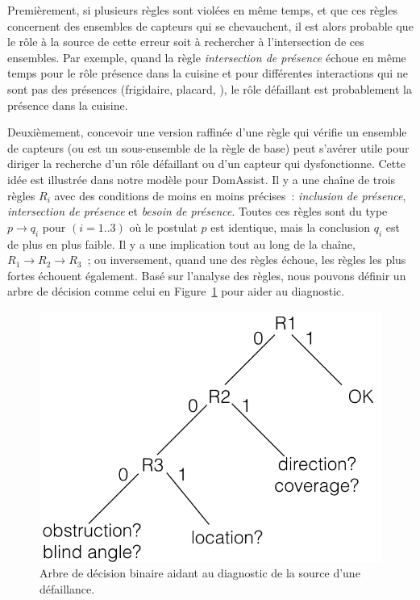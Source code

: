 Premièrement, si plusieurs règles sont violées en même temps, et que ces règles 
concernent des ensembles de capteurs qui se chevauchent, il est alors probable 
que le rôle à la source de cette erreur soit à rechercher à l'intersection de 
ces ensembles. Par exemple, quand la règle {\em intersection de présence} 
échoue en même temps pour le rôle présence dans la cuisine et pour différentes 
interactions qui ne sont pas des présences (frigidaire, placard, \etc), 
le rôle défaillant est 
probablement 
la présence 
dans la cuisine. 

Deuxièmement, concevoir une version raffinée d'une règle qui vérifie un ensemble 
de capteurs (ou est un sous-ensemble de la règle de base) peut s'avérer utile 
pour diriger la recherche d'un rôle défaillant ou d'un capteur qui dysfonctionne. 
Cette idée est illustrée dans notre modèle pour DomAssist. Il y a une chaîne 
de trois règles $R_i$ avec des conditions de moins en moins précises~:
{\em inclusion de présence}, {\em intersection de présence} et 
{\em besoin de présence}. Toutes ces règles sont du type 
$p \rightarrow q_i$ pour $(i=1..3)$ où le postulat $p$ est identique, mais la 
conclusion $q_i$ est de plus en plus faible. Il y a une implication tout au long 
de la chaîne, $R_1 \rightarrow R_2 \rightarrow R_3$~; ou inversement, quand une 
des règles échoue, les règles les plus fortes échouent également. Basé sur 
l'analyse des règles, nous pouvons définir un arbre de décision comme celui en 
Figure~\ref{fig:bdd} pour aider au diagnostic.

\begin{figure}[!h]
  \centering
      \includegraphics[scale=0.3]{gfx/bdd.png}
      \caption{Arbre de décision binaire aidant au diagnostic de la source d'une défaillance.}
      \label{fig:bdd}
\end{figure}

